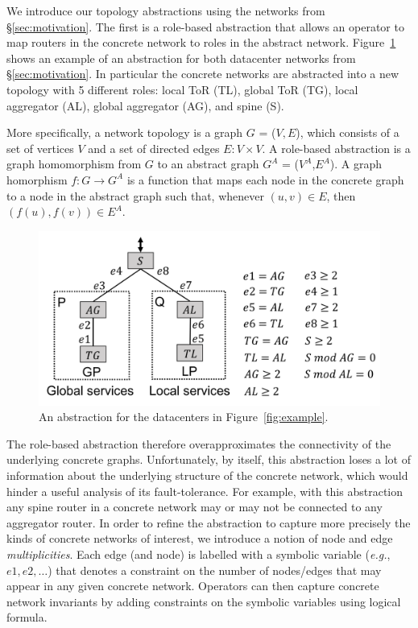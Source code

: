 \documentclass[numbers, 10pt, preprint]{sigplanconf}
\newcommand{\EG}{\emph{e.g.}}
\newcommand{\sysname}{{\small \sf Methane}\xspace}
\begin{document}
 
We introduce our topology abstractions using the networks from \S\ref{sec:motivation}.
The first is a role-based abstraction that allows an operator to map routers in the concrete network to roles in the abstract network. Figure~\ref{fig:example3} shows an example of an abstraction for both datacenter networks from \S\ref{sec:motivation}. In particular the concrete networks are abstracted into a new topology with 5 different roles: local ToR (TL), global ToR (TG), local aggregator (AL), global aggregator (AG), and spine (S).

More specifically, a network topology is a graph $G$ = ($V, E$), which consists of a set of vertices $V$ and a set of directed edges $E \colon V \times V$. A role-based abstraction is a graph homomorphism from $G$ to an abstract graph $G^A$ = ($V^A$,$E^A$). A graph homorphism $f : G \rightarrow G^A$ is a function that maps each node in the concrete graph to a node in the abstract graph such that, whenever $(u,v) \in E$, then $(f(u),f(v)) \in E^A$.


\begin{figure}[t!]
  \centering
  \includegraphics[width=\columnwidth]{figures/example3}
  \caption{An abstraction for the datacenters in Figure~\ref{fig:example}.}
  \label{fig:example3}
  \vspace{-1em}
\end{figure}

The role-based abstraction therefore overapproximates the connectivity of the underlying concrete graphs. Unfortunately, by itself, this abstraction loses a lot of information about the underlying structure of the concrete network, which would hinder a useful analysis of its fault-tolerance. For example, with this abstraction any spine router in a concrete network may or may not be connected to any aggregator router.
%
In order to refine the abstraction to capture more precisely the kinds of concrete networks of interest,
we introduce a notion of node and edge \emph{multiplicities}. Each edge (and node) is labelled
with a symbolic variable (\EG, $e1, e2, \ldots$) that denotes a constraint on the number of nodes/edges
that may appear in any given concrete network. Operators can then capture concrete network invariants by adding constraints on the symbolic variables using logical formula.
\end{document}
